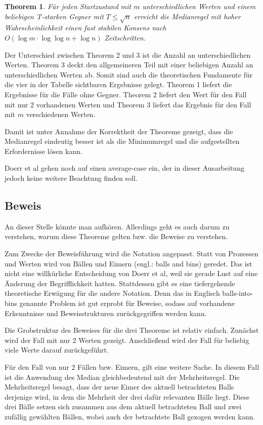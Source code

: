 \documentclass[12pt,ngerman,a4paper]{scrartcl}
\theoremstyle{plain}
\newtheorem{theorem}{Theorem}
\theoremstyle{definition}
\theoremstyle{remark}
\begin{document}
\begin{theorem}
Für jeden Startzustand mit $m$ unterschiedlichen Werten und einem beliebigen
T-starken Gegner mit $T \leq \sqrt{n}$ erreicht die Medianregel mit hoher
Wahrscheinlichkeit einen fast stabilen Konsens nach
$O(\log m \cdot \log \log n + \log n)$ Zeitschritten.
\end{theorem}

Der Unterschied zwischen Theorem 2 und 3 ist die Anzahl an unterschiedlichen
Werten. Theorem 3 deckt den allgemeineren Teil mit einer beliebigen Anzahl an
unterschiedlichen Werten ab. Somit sind auch die theoretischen Fundamente für
die vier in der Tabelle sichtbaren Ergebnisse gelegt. Theorem 1 liefert die
Ergebnisse für die Fälle ohne Gegner. Theorem 2 liefert den Wert für den Fall
mit nur 2 vorhandenen Werten und Theorem 3 liefert das Ergebnis für den Fall
mit $m$ verschiedenen Werten.

Damit ist unter Annahme der Korrektheit der Theoreme gezeigt, dass die Medianregel
eindeutig besser ist als die Minimumregel und die aufgestellten Erfordernisse
lösen kann.

Doerr et al gehen noch auf einen average-case ein, der in dieser Ausarbeitung
jedoch keine weitere Beachtung finden soll.

\subsection{Beweis}

An dieser Stelle könnte man aufhören. Allerdings geht es auch darum zu verstehen,
warum diese Theoreme gelten bzw. die Beweise zu verstehen.

Zum Zwecke der Beweisführung wird die Notation angepasst. Statt von Prozessen
und Werten wird von Bällen und Eimern (engl.: balls and bins) geredet. Das ist
nicht eine willkürliche Entscheidung von Doerr et al, weil sie gerade Lust auf
eine Änderung der Begrifflichkeit hatten. Stattdessen gibt es eine tiefergehende
theoretische Erwägung für die andere Notation. Denn das in Englisch balls-into-bins
genannte Problem ist gut erprobt für Beweise, sodass auf vorhandene Erkenntnisse
und Beweisstrukturen zurückgegriffen werden kann.

Die Grobstruktur des Beweises für die drei Theoreme ist relativ einfach.
Zunächst wird der Fall mit nur 2 Werten gezeigt. Anschließend wird der Fall für
beliebig viele Werte darauf zurückgeführt.

Für den Fall von nur 2 Fällen bzw. Eimern, gilt eine weitere Sache. In diesem
Fall ist die Anwendung des Median gleichbedeutend mit der Mehrheitsregel. Die
Mehrheitsregel besagt, dass der neue Eimer des aktuell betrachteten Balls derjenige
wird, in dem die Mehrheit der drei dafür relevanten Bälle liegt. Diese drei Bälle
setzen sich zusammen aus dem aktuell betrachteten Ball und zwei zufällig gewählten
Bällen, wobei auch der betrachtete Ball gezogen werden kann.
\end{document}
